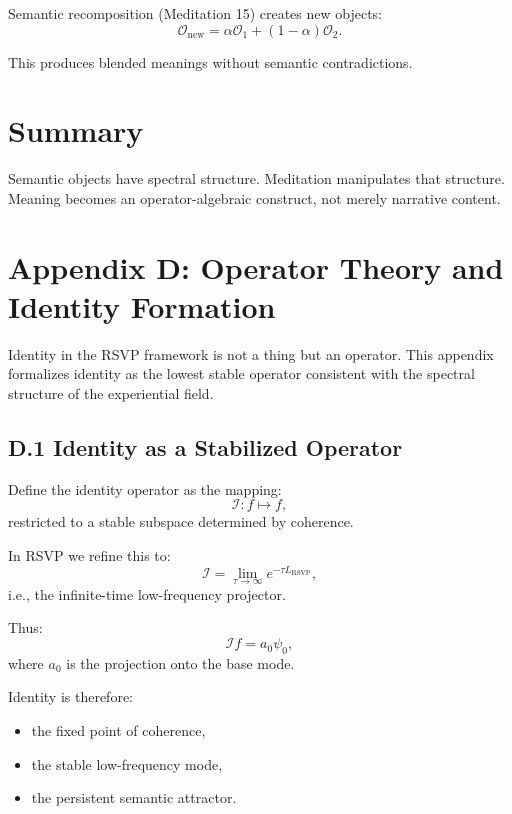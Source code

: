 \documentclass[12pt]{article}
\begin{document}
Semantic recomposition (Meditation 15) creates new objects:
\[
\mathcal{O}_{\text{new}}
=
\alpha \mathcal{O}_1 + (1-\alpha)\mathcal{O}_2.
\]

This produces blended meanings without semantic contradictions.

\section*{Summary}

Semantic objects have spectral structure.  
Meditation manipulates that structure.  
Meaning becomes an operator-algebraic construct, not merely narrative content.


\section*{Appendix D: Operator Theory and Identity Formation}

Identity in the RSVP framework is not a thing but an operator.
This appendix formalizes identity as the lowest stable operator consistent with
the spectral structure of the experiential field.

\subsection*{D.1 Identity as a Stabilized Operator}

Define the identity operator as the mapping:
\[
\mathcal{I} : f \mapsto f,
\]
restricted to a stable subspace determined by coherence.

In RSVP we refine this to:
\[
\mathcal{I}
=
\lim_{\tau \to \infty}
e^{-\tau L_{\text{RSVP}}},
\]
i.e., the infinite-time low-frequency projector.

Thus:
\[
\mathcal{I} f
=
a_0 \psi_0,
\]
where $a_0$ is the projection onto the base mode.

Identity is therefore:
\begin{itemize}
\item the fixed point of coherence,
\item the stable low-frequency mode,
\item the persistent semantic attractor.
\end{itemize}
\end{document}
